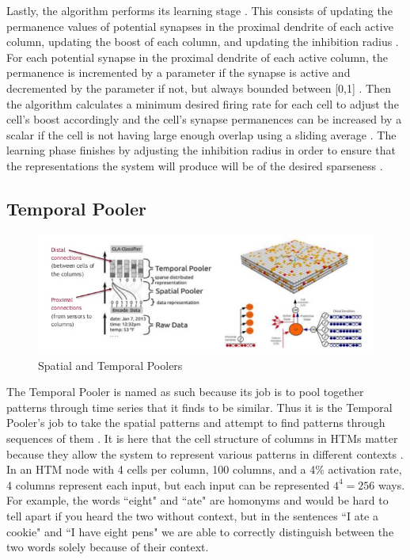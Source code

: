 \documentclass[fleqn,minimal]{article}
\begin{document}
	Lastly, the algorithm performs its learning stage \cite{Whitepaper}. This consists of updating the permanence values of potential synapses in the proximal dendrite of each active column, updating the boost of each column, and updating the inhibition radius \cite{Whitepaper}. For each potential synapse in the proximal dendrite of each active column, the permanence is incremented by a parameter if the synapse is active and decremented by the parameter if not, but always bounded between [0,1] \cite{Whitepaper}. Then the algorithm calculates a minimum desired firing rate for each cell to adjust the cell's boost accordingly and the cell's synapse permanences can be increased by a scalar if the cell is not having large enough overlap using a sliding average \cite{Whitepaper}. The learning phase finishes by adjusting the inhibition radius in order to ensure that the representations the system will produce will be of the desired sparseness \cite{Whitepaper}.
	
	
	\subsection{Temporal Pooler}
	
	\begin{figure}[h!]
		\centering
		\includegraphics[width=\linewidth]{images/Poolers.jpg}
		\caption{Spatial and Temporal Poolers}
		\label{fig 2}
	\end{figure}
	
	The Temporal Pooler is named as such because its job is to pool together patterns through time series that it finds to be similar. Thus it is the Temporal Pooler's job to take the spatial patterns and attempt to find patterns through sequences of them \cite{Principles}. It is here that the cell structure of columns in HTMs matter because they allow the system to represent various patterns in different contexts \cite{Principles}. In an HTM node with 4 cells per column, 100 columns, and a 4\% activation rate, 4 columns represent each input, but each input can be represented $4^{4}=256$ ways. For example, the words ``eight" and ``ate" are homonyms and would be hard to tell apart if you heard the two without context, but in the sentences ``I ate a cookie" and ``I have eight pens" we are able to correctly distinguish between the two words solely because of their context.
	
\end{document}
